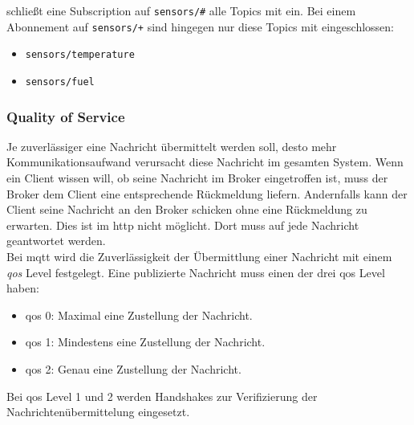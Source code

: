 schlie{\ss}t eine Subscription auf \verb|sensors/#| alle Topics mit ein. Bei einem Abonnement auf \verb|sensors/+| sind hingegen nur diese Topics mit eingeschlossen:
\begin{itemize}
    \item \verb|sensors/temperature|
    \item \verb|sensors/fuel|
\end{itemize}

\subsubsection{Quality of Service} \label{s:qos}
Je zuverlässiger eine Nachricht übermittelt werden soll, desto mehr Kommunikationsaufwand verursacht diese Nachricht im gesamten System.
Wenn ein Client wissen will, ob seine Nachricht im Broker eingetroffen ist, muss der Broker dem Client eine entsprechende Rückmeldung liefern. Andernfalls kann der Client seine Nachricht an den Broker schicken ohne eine Rückmeldung zu erwarten. Dies ist im \ac{http} nicht möglicht. Dort muss auf jede Nachricht geantwortet werden.\\
Bei \ac{mqtt} wird die Zuverlässigkeit der Übermittlung einer Nachricht mit einem \textit{\acf{qos}} Level festgelegt. Eine publizierte Nachricht muss einen der drei \ac{qos} Level haben:
\begin{itemize}
    \item \ac{qos} 0: Maximal eine Zustellung der Nachricht.
    \item \ac{qos} 1: Mindestens eine Zustellung der Nachricht.
    \item \ac{qos} 2: Genau eine Zustellung der Nachricht.
\end{itemize}
Bei \ac{qos} Level 1 und 2 werden Handshakes zur Verifizierung der Nachrichtenübermittelung eingesetzt.\cite{mqtt5Specification}

